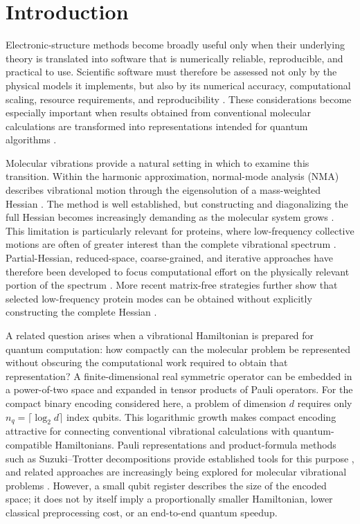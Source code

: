 \documentclass[aip,jcp,reprint,amsmath,amssymb,floatfix]{revtex4-2}
\begin{document}
\section{Introduction}
Electronic-structure methods become broadly useful only when their underlying
theory is translated into software that is numerically reliable,
reproducible, and practical to use. Scientific software must therefore be
assessed not only by the physical models it implements, but also by its
numerical accuracy, computational scaling, resource requirements, and
reproducibility \cite{Sherrill2020Software}. These considerations become
especially important when results obtained from conventional molecular
calculations are transformed into representations intended for quantum
algorithms \cite{Feynman1982Simulation,Lloyd1996Universal,Cao2019QuantumChemistry}.

Molecular vibrations provide a natural setting in which to examine this
transition. Within the harmonic approximation, normal-mode analysis (NMA)
describes vibrational motion through the eigensolution of a mass-weighted
Hessian \cite{Barone2005Anharmonic}. The method is well established, but constructing and diagonalizing
the full Hessian becomes increasingly demanding as the molecular system grows
\cite{Ghysels2010PartialHessian,Bauer2019NMA}. This limitation is particularly
relevant for proteins, where low-frequency collective motions are often of
greater interest than the complete vibrational spectrum
\cite{Bauer2019NMA,Kolossvary2024NMA,Tama2001Conformational}. Partial-Hessian, reduced-space,
coarse-grained, and iterative approaches have therefore been developed to
focus computational effort on the physically relevant portion of the spectrum
\cite{Ghysels2010PartialHessian,Bauer2019NMA}. More recent matrix-free
strategies further show that selected low-frequency protein modes can be
obtained without explicitly constructing the complete Hessian
\cite{Kolossvary2024NMA}.

A related question arises when a vibrational Hamiltonian is prepared for
quantum computation: how compactly can the molecular problem be represented
without obscuring the computational work required to obtain that
representation? A finite-dimensional real symmetric operator can be embedded
in a power-of-two space and expanded in tensor products of Pauli operators.
For the compact binary encoding considered here, a problem of dimension $d$
requires only $n_q=\lceil\log_2 d\rceil$ index qubits. This logarithmic growth makes compact encoding attractive for connecting conventional vibrational calculations with quantum-compatible
Hamiltonians. Pauli representations and product-formula methods such as
Suzuki--Trotter decompositions provide established tools for this purpose \cite{Berry2007Sparse,Berry2015Hamiltonian,Low2019Qubitization}, and
related approaches are increasingly being explored for molecular vibrational
problems \cite{Somasundaram2025VibrationalQC,Whitfield2011ElectronicStructure,Peruzzo2014VQE}. However, a small qubit register
 describes the size of the encoded space; it does not by itself imply
a proportionally smaller Hamiltonian, lower classical preprocessing cost, or
an end-to-end quantum speedup.
\end{document}
